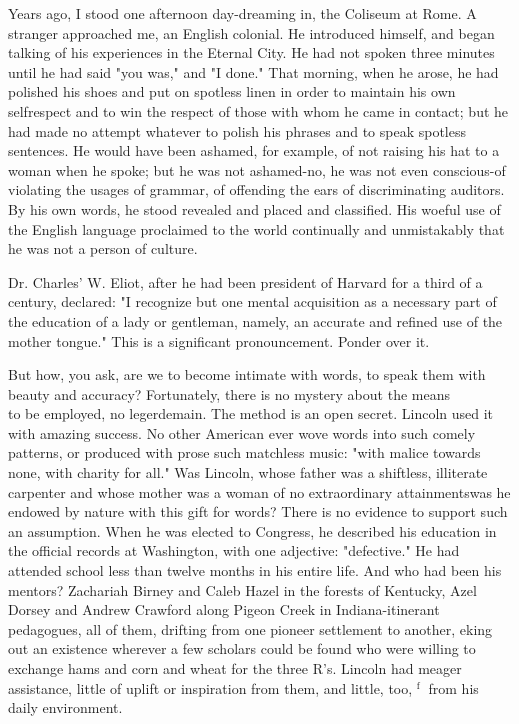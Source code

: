 \documentclass[10pt]{article}
\begin{document}
Years ago, I stood one afternoon day-dreaming in, the Coliseum at Rome. A stranger approached me, an English colonial. He introduced himself, and began talking of his experiences in the Eternal City. He had not spoken three minutes until he had said "you was," and "I done." That morning, when he arose, he had polished his shoes and put on spotless linen in order to maintain his own selfrespect and to win the respect of those with whom he came in contact; but he had made no attempt whatever to polish his phrases and to speak spotless sentences. He would have been ashamed, for example, of not raising his hat to a woman when he spoke; but he was not ashamed-no, he was not even conscious-of violating the usages of grammar, of offending the ears of discriminating auditors. By his own words, he stood revealed and placed and classified. His woeful use of the English language proclaimed to the world continually and unmistakably that he was not a person of culture.

Dr. Charles' W. Eliot, after he had been president of Harvard for a third of a century, declared: "I recognize but one mental acquisition as a necessary part of the education of a lady or gentleman, namely, an accurate and refined use of the mother tongue." This is a significant pronouncement. Ponder over it.

But how, you ask, are we to become intimate with words, to speak them with beauty and accuracy? Fortunately, there is no mystery about the means\\
to be employed, no legerdemain. The method is an open secret. Lincoln used it with amazing success. No other American ever wove words into such comely patterns, or produced with prose such matchless music: "with malice towards none, with charity for all." Was Lincoln, whose father was a shiftless, illiterate carpenter and whose mother was a woman of no extraordinary attainmentswas he endowed by nature with this gift for words? There is no evidence to support such an assumption. When he was elected to Congress, he described his education in the official records at Washington, with one adjective: "defective." He had attended school less than twelve months in his entire life. And who had been his mentors? Zachariah Birney and Caleb Hazel in the forests of Kentucky, Azel Dorsey and Andrew Crawford along Pigeon Creek in Indiana-itinerant pedagogues, all of them, drifting from one pioneer settlement to another, eking out an existence wherever a few scholars could be found who were willing to exchange hams and corn and wheat for the three R's. Lincoln had meager assistance, little of uplift or inspiration from them, and little, too, ${ }^{\text {f }}$ from his daily environment.
\end{document}
